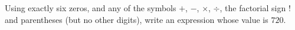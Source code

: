 Using exactly six zeros, and any of the symbols $+$, $-$, $\times$, $\div$, the factorial sign $!$ and parentheses (but no other digits), write an expression whose value is $720$.
